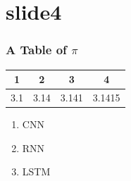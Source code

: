 \documentclass[xcolor=dvipsnames]{beamer}
\begin{document}
        \section{slide4}
        \begin{frame}[t]

            \frametitle{A Table of $\pi$}

            \centering
            \begin{tabular}{|c|c|c|c|} \hline
                1 & 2 & 3 & 4 \\ \hline
                3.1 & 3.14 & 3.141 & 3.1415 \\ \hline
            \end{tabular}

            \begin{enumerate}
                \centering
                \item CNN
                \item RNN
                \item LSTM
            \end{enumerate}

        \end{frame}

    
\end{document}
